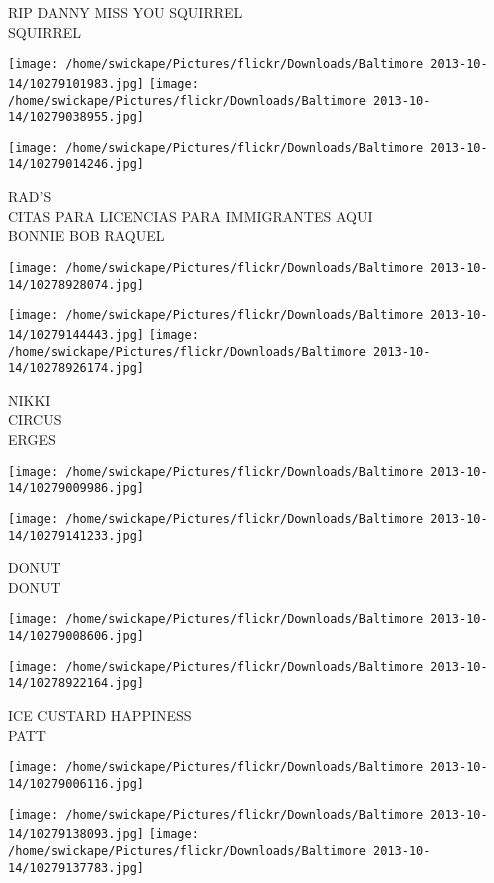 \documentclass[10pt,letterpaper]{article}
\begin{document}
RIP DANNY MISS YOU SQUIRREL\\
SQUIRREL
\pagebreak

\texttt{[image: /home/swickape/Pictures/flickr/Downloads/Baltimore 2013-10-14/10279101983.jpg]}
\texttt{[image: /home/swickape/Pictures/flickr/Downloads/Baltimore 2013-10-14/10279038955.jpg]}

\vspace{0.25in}
\texttt{[image: /home/swickape/Pictures/flickr/Downloads/Baltimore 2013-10-14/10279014246.jpg]}

RAD'S\\
CITAS PARA LICENCIAS PARA IMMIGRANTES AQUI\\
BONNIE BOB RAQUEL
\pagebreak

\texttt{[image: /home/swickape/Pictures/flickr/Downloads/Baltimore 2013-10-14/10278928074.jpg]}

\vspace{0.25in}
\texttt{[image: /home/swickape/Pictures/flickr/Downloads/Baltimore 2013-10-14/10279144443.jpg]}
\texttt{[image: /home/swickape/Pictures/flickr/Downloads/Baltimore 2013-10-14/10278926174.jpg]}

NIKKI\\
CIRCUS\\
ERGES
\pagebreak

\texttt{[image: /home/swickape/Pictures/flickr/Downloads/Baltimore 2013-10-14/10279009986.jpg]}

\vspace{0.25in}
\texttt{[image: /home/swickape/Pictures/flickr/Downloads/Baltimore 2013-10-14/10279141233.jpg]}

DONUT\\
DONUT
\pagebreak

\texttt{[image: /home/swickape/Pictures/flickr/Downloads/Baltimore 2013-10-14/10279008606.jpg]}

\vspace{0.25in}
\texttt{[image: /home/swickape/Pictures/flickr/Downloads/Baltimore 2013-10-14/10278922164.jpg]}

ICE CUSTARD HAPPINESS\\
PATT
\pagebreak

\texttt{[image: /home/swickape/Pictures/flickr/Downloads/Baltimore 2013-10-14/10279006116.jpg]}

\vspace{0.25in}
\texttt{[image: /home/swickape/Pictures/flickr/Downloads/Baltimore 2013-10-14/10279138093.jpg]}
\texttt{[image: /home/swickape/Pictures/flickr/Downloads/Baltimore 2013-10-14/10279137783.jpg]}
\end{document}
